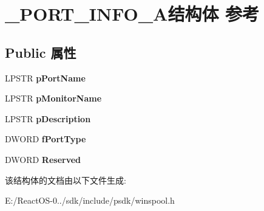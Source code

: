 \hypertarget{struct___p_o_r_t___i_n_f_o__2_a}{}\section{\+\_\+\+P\+O\+R\+T\+\_\+\+I\+N\+F\+O\+\_\+A结构体 参考}
\label{struct___p_o_r_t___i_n_f_o__2_a}
\subsection*{Public 属性}
\begin{DoxyCompactItemize}
\item 
\mbox{\label{struct___p_o_r_t___i_n_f_o__2_a_ae8bee5bdc654f8a1609932734841e505}} 
L\+P\+S\+TR {\bfseries p\+Port\+Name}
\item 
\mbox{\label{struct___p_o_r_t___i_n_f_o__2_a_a3b4aa2a438a2ab19fc2c757a76acfdfa}} 
L\+P\+S\+TR {\bfseries p\+Monitor\+Name}
\item 
\mbox{\label{struct___p_o_r_t___i_n_f_o__2_a_ab979ba918ffd8ade93c534e37c70a7b2}} 
L\+P\+S\+TR {\bfseries p\+Description}
\item 
\mbox{\label{struct___p_o_r_t___i_n_f_o__2_a_a08faca16ff57f7b20012b7329680df5b}} 
D\+W\+O\+RD {\bfseries f\+Port\+Type}
\item 
\mbox{\label{struct___p_o_r_t___i_n_f_o__2_a_a823018dff7bde7abae3e7ad018be129e}} 
D\+W\+O\+RD {\bfseries Reserved}
\end{DoxyCompactItemize}


该结构体的文档由以下文件生成\+:\begin{DoxyCompactItemize}
\item 
E\+:/\+React\+O\+S-\/0../sdk/include/psdk/winspool.\+h\end{DoxyCompactItemize}
